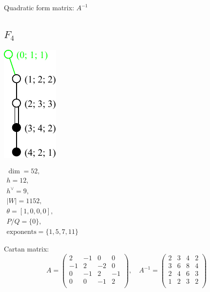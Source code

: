 \documentclass[12pt]{article}
\newcommand{\hc}{h^{\vee}}
\begin{document}
Quadratic form matrix: $A^{-1}$

%
%
\newpage
%
\subsection*{$F_4$}
\parbox{8cm}{\includegraphics{lie_F4.pdf}}
$
\begin{array}{l}
 \dim = 52, \\
  h= 12,\\
 \hc= 9,\\
 |W|=1152,\\
 \theta=[1,0,0,0],\\
 P/Q=\{0\},\\
 \text{exponents}={\{1,5,7,11\}}
\end{array}
$

Cartan matrix:
\[
A=\left(
\begin{array}{cccc}
 2& -1& 0& 0\\
 -1& 2& -2&0 \\
 0 &-1 &2 &-1 \\
 0 &0  &-1 &2 \\
\end{array}
\right),\quad
A^{-1}=\left(
\begin{array}{cccc}
 2& 3 & 4& 2\\
 3 & 6&  8&4 \\
 2 & 4 &6 & 3 \\
 1 &2  & 3 &2 \\
\end{array}
\right)
\]
\end{document}
